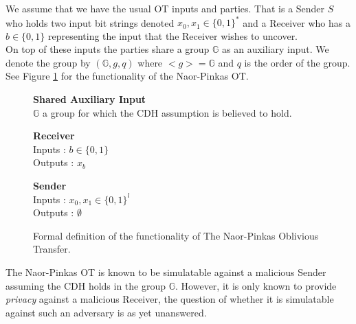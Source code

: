 \documentclass[ %
                    author={Nicholas Tutte},
                supervisor={Prof. Nigel Smart},
                    degree={MEng},
                     title={Secure Two Party Computation},
                  subtitle={A practical comparison of recent protocols},
                      type={Research - GG1K},
                      year={2015} ]{dissertation}
\begin{document}
				We assume that we have the usual OT inputs and parties. That is a Sender $S$ who holds two input bit strings denoted $x_0, x_1 \in \{0, 1\}^*$ and a Receiver who has a $b \in \{0, 1\}$ representing the  input that the Receiver wishes to uncover.\\

				On top of these inputs the parties share a group $\mathbb{G}$ as an auxiliary input. We denote the group by $(\mathbb{G}, g, q)$ where $<g> = \mathbb{G}$ and $q$ is the order of the group.\\ %

				See Figure \ref{fig:NPOT_Functionality} for the functionality of the Naor-Pinkas OT.\\


				\begin{figure}[!htb]
					\centering
					
					\textbf{Shared Auxiliary Input}\\
					$\mathbb{G}$ a group for which the CDH assumption is believed to hold.\\
					\vspace{0.3cm}
					\begin{minipage}{0.45\textwidth}
						\centering
						\textbf{Receiver}\\
						Inputs : $b \in \{0, 1\}$\\
						Outputs : $x_b$\\
					\end{minipage}
					\begin{minipage}{0.45\textwidth}
						\centering
						\textbf{Sender}\\
						Inputs : $x_0, x_1 \in \{0, 1\}^l$\\
						Outputs : $\emptyset$\\
					\end{minipage}

					\caption{ Formal definition of the functionality of The Naor-Pinkas Oblivious Transfer.\label{fig:NPOT_Functionality}}
				\end{figure}

				The Naor-Pinkas OT is known to be simulatable against a malicious Sender assuming the CDH holds in the group $\mathbb{G}$. However, it is only known to provide \emph{privacy} against a malicious Receiver, the question of whether it is simulatable against such an adversary is as yet unanswered.
\end{document}
